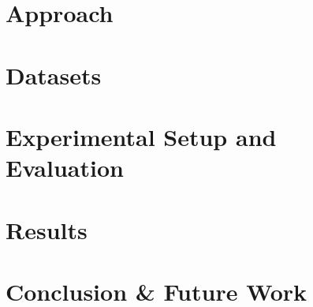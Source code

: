 \documentclass{sig-alternate}
\begin{document}
\section{Approach}


\section{Datasets}

% 
% 
% 
\section{Experimental Setup and Evaluation}


\section{Results}


\section{Conclusion \& Future Work}



%

%
%


\end{document}
